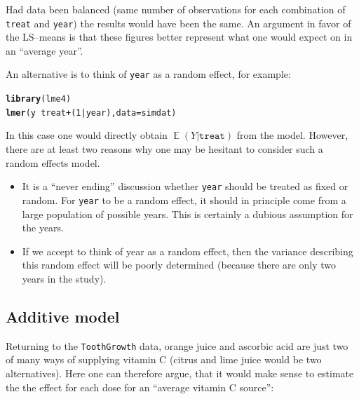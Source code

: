 \documentclass[10pt]{article}\usepackage[]{graphicx}\usepackage[]{color}
\makeatletter
\newcommand{\hlnum}[1]{\textcolor[rgb]{0.686,0.059,0.569}{#1}}%
\newcommand{\hlopt}[1]{\textcolor[rgb]{0,0,0}{#1}}%
\newcommand{\hlstd}[1]{\textcolor[rgb]{0.345,0.345,0.345}{#1}}%
\newcommand{\hlkwc}[1]{\textcolor[rgb]{0.333,0.667,0.333}{#1}}%
\newcommand{\hlkwd}[1]{\textcolor[rgb]{0.737,0.353,0.396}{\textbf{#1}}}%
\newenvironment{kframe}{%
 \def\at@end@of@kframe{}%
 \ifinner\ifhmode%
  \def\at@end@of@kframe{\end{minipage}}%
  \begin{minipage}{\columnwidth}%
 \fi\fi%
 \def\FrameCommand##1{\hskip\@totalleftmargin \hskip-\fboxsep
 \colorbox{shadecolor}{##1}\hskip-\fboxsep
     \hskip-\linewidth \hskip-\@totalleftmargin \hskip\columnwidth}%
 \MakeFramed {\advance\hsize-\width
   \@totalleftmargin\z@ \linewidth\hsize
   \@setminipage}}%
 {\par\unskip\endMakeFramed%
 \at@end@of@kframe}
\newenvironment{knitrout}{}{} %
\def\cc#1{\texttt{#1}}
\DeclareMathOperator{\EE}{\mathbb{E}}
\makeatother
\begin{document}
Had data been balanced (same number of observations for each
combination of \cc{treat} and \cc{year}) the results would have been the
same. An argument in favor of the LS--means is that these figures
better represent what one would expect on in an ``average year''.

An alternative is to think of  \cc{year} as a random
effect, for example:
\begin{knitrout}
\color{fgcolor}\begin{kframe}
\begin{alltt}
\hlkwd{library}\hlstd{(lme4)}
\hlkwd{lmer}\hlstd{( y} \hlopt{~} \hlstd{treat}  \hlopt{+} \hlstd{(}\hlnum{1}\hlopt{|}\hlstd{year),} \hlkwc{data}\hlstd{=simdat)}
\end{alltt}
\end{kframe}
\end{knitrout}

In this case one would directly obtain $\EE(Y|\cc{treat})$ from the
model. However, there are at least two reasons why one may be hesitant
to consider such a random effects model.
\begin{itemize}
\item It is a ``never ending'' discussion whether \verb|year| should
  be treated as fixed or random. For \verb|year| to be a random
  effect, it should in principle come from a large population of
  possible years. This is certainly a dubious assumption for the
  years.
\item If we accept to think of year as a random effect, then the
  variance describing this random effect will be poorly determined
  (because there are only two years in the study).
\end{itemize}

\subsection{Additive model}
\label{sec:additive-model}


Returning to the \verb|ToothGrowth| data, orange juice and ascorbic
acid are just two of many ways of supplying vitamin C (citrus and lime
juice would be two alternatives). Here one can therefore argue, that
it would make sense to estimate the the effect for each dose for an
``average vitamin C source'':
\end{document}
